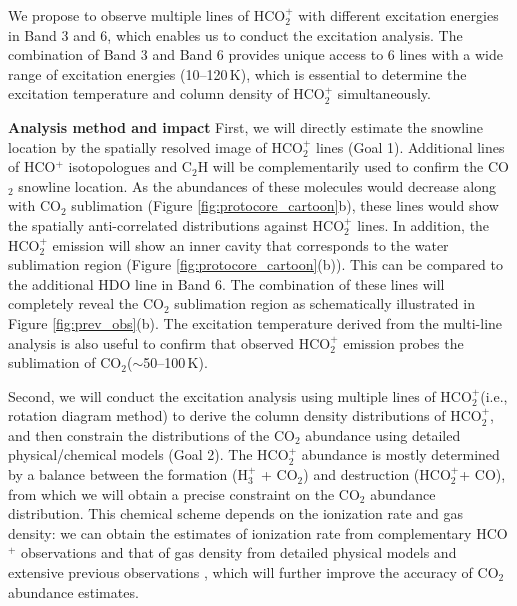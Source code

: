 \documentclass[12pt,a4paper]{article}  %
\newcommand{\carbondioxide}{CO$_2$\xspace}
\newcommand{\protonatedcarbondioxide}{HCO$_2^+$\xspace}
\begin{document}
We propose to observe multiple lines of \protonatedcarbondioxide with different excitation energies in Band 3 and 6, which enables us to conduct the excitation analysis. The combination of Band 3 and Band 6 provides unique access to 6 lines with a wide range of excitation energies (10--120\,K), which is essential to determine the excitation temperature and column density of \protonatedcarbondioxide simultaneously. 

\smallskip
\noindent \textbf{Analysis method and impact} \quad First, we will directly estimate the snowline location by the spatially resolved image of \protonatedcarbondioxide lines (Goal 1). Additional lines of HCO$^+$ isotopologues and C$_2$H will be complementarily used to confirm the \carbondioxide snowline location. As the abundances of these molecules would decrease along with \carbondioxide sublimation (Figure \ref{fig:protocore_cartoon}b), these lines would show the spatially anti-correlated distributions against \protonatedcarbondioxide lines. In addition, the \protonatedcarbondioxide emission will show an inner cavity that corresponds to the water sublimation region (Figure \ref{fig:protocore_cartoon}(b)). This can be compared to the additional HDO line in Band 6. The combination of these lines will completely reveal the \carbondioxide sublimation region as schematically illustrated in Figure \ref{fig:prev_obs}(b). The excitation temperature derived from the multi-line analysis is also useful to confirm that observed \protonatedcarbondioxide emission probes the sublimation of \carbondioxide ($\sim$50--100\,K).

Second, we will conduct the excitation analysis using multiple lines of \protonatedcarbondioxide (i.e., rotation diagram method) to derive the column density distributions of \protonatedcarbondioxide, and then constrain the distributions of the \carbondioxide abundance using detailed physical/chemical models (Goal 2). The \protonatedcarbondioxide abundance is mostly determined by a balance between the formation (H$_3^+$ + \carbondioxide) and destruction (\protonatedcarbondioxide + CO), from which we will obtain a precise constraint on the \carbondioxide abundance distribution. This chemical scheme depends on the ionization rate and gas density: we can obtain the estimates of ionization rate from complementary HCO$^+$ observations and that of gas density from detailed physical models \citep[e.g.,][]{Aikawa20} and extensive previous observations \citep[e.g.,][]{Jacobsen19}, which will further improve the accuracy of \carbondioxide abundance estimates.   
\end{document}
